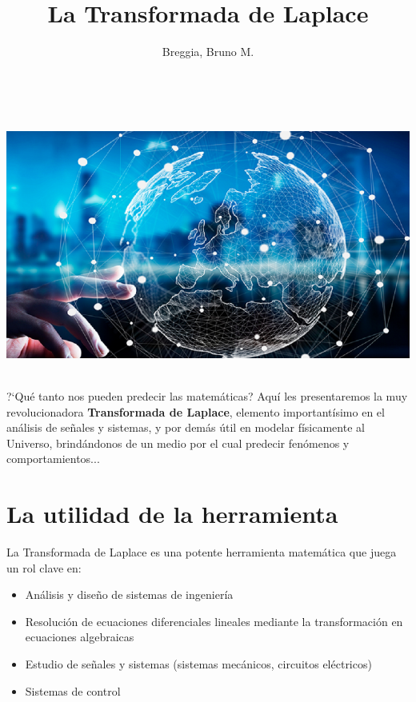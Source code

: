 \documentclass[12pt]{article}
\theoremstyle{definition}
\theoremstyle{theorem}
\theoremstyle{corolary}
\theoremstyle{method}
\begin{document}
	\title{La Transformada de Laplace}
	\author{Breggia, Bruno M.}
	\date{}
	\maketitle

\ \\

\begin{center}
	\includegraphics[scale=0.6]{El_mundo.png}
\end{center}

\ \\

?`Qu\'e tanto nos pueden predecir las matem\'aticas? Aqu\'i les presentaremos la muy revolucionadora \textbf{Transformada de Laplace}, elemento important\'isimo en el an\'alisis de se\~nales y sistemas, y por dem\'as \'util en modelar f\'isicamente al Universo, brind\'andonos de un medio por el cual predecir fen\'omenos y comportamientos...


\pagebreak

\section{La utilidad de la herramienta}
La Transformada de Laplace es una potente herramienta matem\'atica que juega un rol clave en:
\begin{itemize}
	\item An\'alisis y dise\~no de sistemas de ingenier\'ia
	\item Resoluci\'on de ecuaciones diferenciales lineales mediante la transformaci\'on en ecuaciones algebraicas
	\item Estudio de se\~nales y sistemas (sistemas mec\'anicos, circuitos el\'ectricos)
	\item Sistemas de control
\end{itemize}
\end{document}
